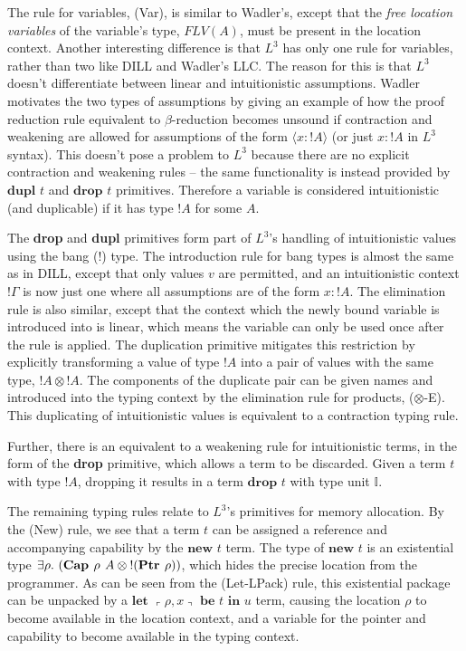 \documentclass[]{unswthesis}
\newcommand{\Exists}[1]{\exists #1 \ldotp \,}
\newcommand{\letbe}[3]{\textbf{let $#1$ be $#2$ in $#3$}}
\newcommand{\Ptr}[1]{\textbf{Ptr $#1$}}
\newcommand{\Capa}[2]{\textbf{Cap $#1$ $#2$}}
\newcommand{\lquine}{\left\ulcorner}
\newcommand{\rquine}{\right\urcorner}
\newcommand{\dupl}[1]{\textbf{dupl $#1$}}
\newcommand{\drop}[1]{\textbf{drop $#1$}}
\newcommand{\lnew}[1]{\textbf{new $#1$}}
\newcommand{\qpair}[2]{\lquine #1, #2 \rquine}
\let\i\textit
\let\b\textbf
\begin{document}
The rule for variables, (Var), is similar to Wadler's, except that the \i{free location variables} of the variable's type, $FLV(A)$, must be present in the location context. Another interesting difference is that $L^3$ has only one rule for variables, rather than two like DILL and Wadler's LLC. The reason for this is that $L^3$ doesn't differentiate between linear and intuitionistic assumptions. Wadler motivates the two types of assumptions by giving an example of how the proof reduction rule equivalent to $\beta$-reduction becomes unsound if contraction and weakening are allowed for assumptions of the form $\langle x : {!A} \rangle$ (or just $x : {!A}$ in $L^3$ syntax). This doesn't pose a problem to $L^3$ because there are no explicit contraction and weakening rules -- the same functionality is instead provided by $\dupl{t}$ and $\drop{t}$ primitives. Therefore a variable is considered intuitionistic (and duplicable) if it has type ${!A}$ for some $A$.

The \b{drop} and \b{dupl} primitives form part of $L^3$'s handling of intuitionistic values using the bang (!) type. The introduction rule for bang types is almost the same as in DILL, except that only values $v$ are permitted, and an intuitionistic context $!\Gamma$ is now just one where all assumptions are of the form $x : {!A}$. The elimination rule is also similar, except that the context which the newly bound variable is introduced into is linear, which means the variable can only be used once after the rule is applied. The duplication primitive mitigates this restriction by explicitly transforming a value of type $!A$ into a pair of values with the same type, ${!A} \otimes {!A}$. The components of the duplicate pair can be given names and introduced into the typing context by the elimination rule for products, ($\otimes$-E). This duplicating of intuitionistic values is equivalent to a contraction typing rule.

Further, there is an equivalent to a weakening rule for intuitionistic terms, in the form of the \b{drop} primitive, which allows a term to be discarded. Given a term $t$ with type ${!A}$, dropping it results in a term $\drop{t}$ with type unit $\mathds{I}$.

The remaining typing rules relate to $L^3$'s primitives for memory allocation. By the (New) rule, we see that a term $t$ can be assigned a reference and accompanying capability by the $\lnew{t}$ term. The type of $\lnew{t}$ is an existential type $\Exists{\rho} (\Capa{\rho}{A} \otimes {!(\Ptr{\rho})})$, which hides the precise location from the programmer. As can be seen from the (Let-LPack) rule, this existential package can be unpacked by a $\letbe{\qpair{\rho}{x}}{t}{u}$ term, causing the location $\rho$ to become available in the location context, and a variable for the pointer and capability to become available in the typing context.
\end{document}
